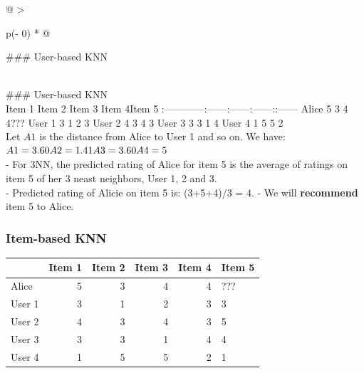 \documentclass[
]{article}
\begin{document}
\begin{longtable}[]{@{}
  >{\raggedright\arraybackslash}p{(\columnwidth - 0\tabcolsep) * }@{}}
\toprule
\begin{minipage}[b]{\linewidth}\raggedright
\#\#\# User-based KNN
\end{minipage} \\
\midrule
\endhead
\#\#\# User-based KNN \\
\textbar{} \textbar{} Item 1\textbar{} Item 2\textbar{} Item 3\textbar{}
Item 4\textbar Item 5 \textbar{}
\textbar:------\textbar------:\textbar------:\textbar------:\textbar------:\textbar:------\textbar{}
\textbar Alice \textbar{} 5\textbar{} 3\textbar{} 4\textbar{}
4\textbar??? \textbar{} \textbar User 1 \textbar{} 3\textbar{}
1\textbar{} 2\textbar{} 3 \textbar{} \textbar User 2 \textbar{}
4\textbar{} 3\textbar{} 4\textbar{} 3 \textbar{} \textbar User
3 \textbar{} 3\textbar{} 3\textbar{} 1\textbar{} 4 \textbar{}
\textbar User 4 \textbar{} 1\textbar{} 5\textbar{} 5\textbar{}
2 \textbar{} \\
Let \(A1\) is the distance from Alice to User 1 and so on. We have: \\
\(
A1 = 3.60 \\
A2 = 1.41 \\
A3 = 3.60 \\
A4 = 5
\) \\
- For 3NN, the predicted rating of Alice for item 5 is the average of
ratings on item 5 of her 3 neast neighbors, User 1, 2 and 3. \\
- Predicted rating of Alicie on item 5 is: (3+5+4)/3 = 4. - We will
\textbf{recommend} item 5 to Alice. \\
\bottomrule
\end{longtable}

\hypertarget{item-based-knn}{%
\subsubsection{Item-based KNN}\label{item-based-knn}}

\begin{longtable}[]{@{}lrrrrl@{}}
\toprule
& Item 1 & Item 2 & Item 3 & Item 4 & Item 5 \\
\midrule
\endhead
Alice & 5 & 3 & 4 & 4 & ??? \\
User 1 & 3 & 1 & 2 & 3 & 3 \\
User 2 & 4 & 3 & 4 & 3 & 5 \\
User 3 & 3 & 3 & 1 & 4 & 4 \\
User 4 & 1 & 5 & 5 & 2 & 1 \\
\bottomrule
\end{longtable}
\end{document}
